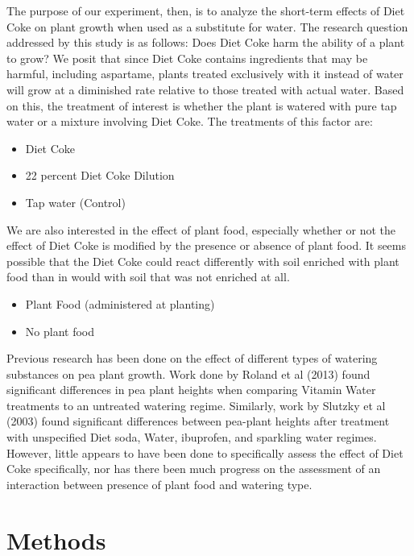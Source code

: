 \documentclass[preprint,12pt]{elsarticle}\usepackage[]{graphicx}\usepackage[]{color}
\begin{document}
The purpose of our experiment, then, is to analyze the short-term effects of Diet Coke on plant growth when used as a substitute for water. The research question addressed by this study is as follows: Does Diet Coke harm the ability of a plant to grow? We posit that since Diet Coke contains ingredients that may be harmful, including aspartame, plants treated exclusively with it instead of water will grow at
a diminished rate relative to those treated with actual water. Based on this, the treatment of interest is whether the plant is watered with pure tap water or a mixture involving Diet Coke. The treatments of this factor are:

\begin{itemize}
\item Diet Coke
\item 22 percent Diet Coke Dilution
\item Tap water (Control)
\end{itemize}

We are also interested in the effect of plant food,  especially whether or not the effect of Diet Coke is modified by the presence or absence of plant food.  It seems possible that the Diet Coke could react differently with soil enriched with plant food than in would with soil that was not enriched at all. 

\begin{itemize}
\item Plant Food (administered at planting)
\item No plant food
\end{itemize}

Previous research has been done on the effect of different types of watering substances on pea plant growth. Work done by Roland et al (2013) found significant differences in pea plant heights when comparing Vitamin Water treatments to an untreated watering regime. Similarly, work by Slutzky et al (2003) found significant differences between pea-plant heights after treatment with unspecified Diet soda, Water, ibuprofen, and sparkling water regimes. However, little appears to have been done to specifically assess the effect of Diet Coke specifically, nor has there been much progress on the assessment of an interaction between presence of plant food and watering type.   




\section{Methods}
\end{document}
